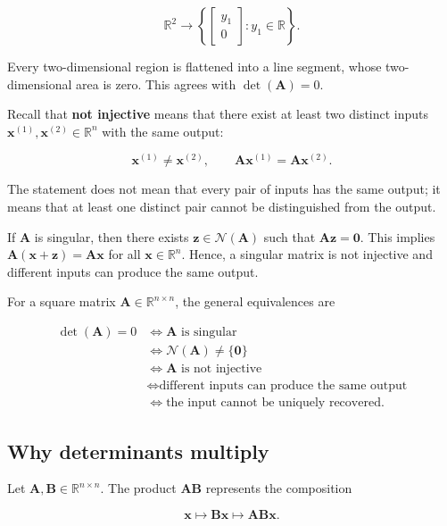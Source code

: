 \documentclass[
  australian,
  12pt,
  letterpaper,
  DIV=11,
  numbers=noendperiod,
  twoside]{scrreprt}
\begin{document}
\[
\mathbb R^2
\longrightarrow
\left\{
\begin{bmatrix}
y_1\\
0
\end{bmatrix}
:y_1\in\mathbb R
\right\}.
\]

Every two-dimensional region is flattened into a line segment, whose
two-dimensional area is zero. This agrees with \(\det(\mathbf A)=0\).

Recall that \textbf{not injective} means that there exist at least two
distinct inputs \(\mathbf x^{(1)},\mathbf x^{(2)}\in\mathbb R^n\) with
the same output:

\[
\mathbf x^{(1)}\neq\mathbf x^{(2)},
\qquad
\mathbf A\mathbf x^{(1)}=\mathbf A\mathbf x^{(2)}.
\]

The statement does not mean that every pair of inputs has the same
output; it means that at least one distinct pair cannot be distinguished
from the output.

If \(\mathbf A\) is singular, then there exists
\(\mathbf z \in \mathcal N(\mathbf A)\) such that
\(\mathbf A \mathbf z = \mathbf 0\). This implies
\(\mathbf A(\mathbf x+\mathbf z) = \mathbf A\mathbf x\) for all
\(\mathbf x \in \mathbb R^n\). Hence, a singular matrix is not injective
and different inputs can produce the same output.

For a square matrix \(\mathbf A\in\mathbb R^{n\times n}\), the general
equivalences are

\[
\boxed{
\begin{aligned}
\det(\mathbf A)=0
&\Longleftrightarrow \mathbf A\text{ is singular}\\
&\Longleftrightarrow \mathcal N(\mathbf A)\neq\{\mathbf0\}\\
&\Longleftrightarrow \mathbf A\text{ is not injective}\\
&\Longleftrightarrow \text{different inputs can produce the same output}\\
&\Longleftrightarrow \text{the input cannot be uniquely recovered}.
\end{aligned}
}
\]

\subsection{Why determinants multiply}\label{why-determinants-multiply}

Let \(\mathbf A,\mathbf B\in\mathbb R^{n\times n}\). The product
\(\mathbf A\mathbf B\) represents the composition

\[
\mathbf x \mapsto \mathbf B\mathbf x \mapsto \mathbf A\mathbf B\mathbf x.
\]
\end{document}
